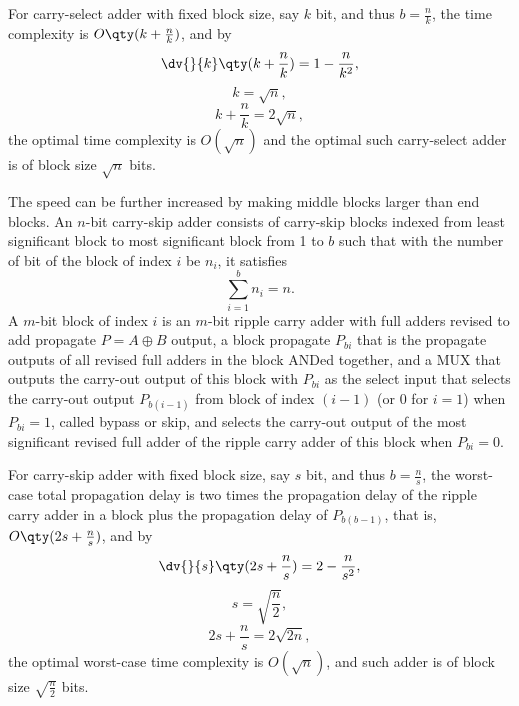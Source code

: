 \documentclass[a4paper,12pt]{report}
\begin{document}
For carry-select adder with fixed block size, say $k$ bit, and thus $b=\frac{n}{k}$, the time complexity is $O\qty(k+\frac{n}{k})$, and by
\[\dv{}{k}\qty(k+\frac{n}{k})=1-\frac{n}{k^2},\]
\[k=\sqrt{n},\]
\[k+\frac{n}{k}=2\sqrt{n},\]
the optimal time complexity is $O(\sqrt{n})$ and the optimal such carry-select adder is of block size $\sqrt{n}$ bits.

The speed can be further increased by making middle blocks larger than end blocks.
An $n$-bit carry-skip adder consists of carry-skip blocks indexed from least significant block to most significant block from 1 to $b$ such that with the number of bit of the block of index $i$ be $n_i$, it satisfies
\[\sum_{i=1}^bn_i=n.\]
A $m$-bit block of index $i$ is an $m$-bit ripple carry adder with full adders revised to add propagate $P=A\oplus B$ output, a block propagate $P_{bi}$ that is the propagate outputs of all revised full adders in the block ANDed together, and a MUX that outputs the carry-out output of this block with $P_{bi}$ as the select input that selects the carry-out output $P_{b(i-1)}$ from block of index $(i-1)$ (or 0 for $i=1$) when $P_{bi}=1$, called bypass or skip, and selects the carry-out output of the most significant revised full adder of the ripple carry adder of this block when $P_{bi}=0$.

For carry-skip adder with fixed block size, say $s$ bit, and thus $b=\frac{n}{s}$, the worst-case total propagation delay is two times the propagation delay of the ripple carry adder in a block plus the propagation delay of $P_{b(b-1)}$, that is, $O\qty(2s+\frac{n}{s})$, and by
\[\dv{}{s}\qty(2s+\frac{n}{s})=2-\frac{n}{s^2},\]
\[s=\sqrt{\frac{n}{2}},\]
\[2s+\frac{n}{s}=2\sqrt{2n},\]
the optimal worst-case time complexity is $O(\sqrt{n})$, and such adder is of block size $\sqrt{\frac{n}{2}}$ bits.
\end{document}
